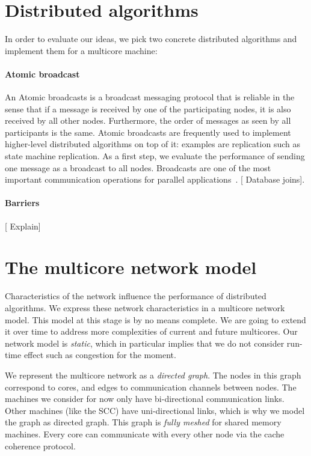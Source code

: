 \documentclass{article}
\newcommand{\stefan}[1]{
  {\color{skRed}[{\color{red}{SK}} #1]}}
\begin{document}
\section{Distributed algorithms}
\label{sec:distalgo}

In order to evaluate our ideas, we pick two concrete distributed
algorithms and implement them for a multicore machine:

\paragraph{Atomic broadcast} An Atomic broadcasts is a broadcast
messaging protocol that is reliable in the sense that if a message is
received by one of the participating nodes, it is also received by all
other nodes. Furthermore, the order of messages as seen by all
participants is the same. Atomic broadcasts are frequently used to
implement higher-level distributed algorithms on top of it: examples
are replication such as state machine replication. As a first step, we
evaluate the performance of sending one message as a broadcast to all
nodes. Broadcasts are one of the most important communication
operations for parallel applications~\cite{Bruck1992}. \stefan{Database
  joins}.

\paragraph{Barriers} \stefan{Explain}

\section{The multicore network model}
\label{sec:model}

Characteristics of the network influence the performance of
distributed algorithms. 
We express these network characteristics in a multicore network
model. This model at this stage is by no means complete. We are going to
extend it over time to address more complexities of current and future
multicores.
Our network model is \emph{static}, which in particular implies that
we do not consider run-time effect such as congestion for the moment.

We represent the multicore network as a \emph{directed graph}. The nodes in
this graph correspond to cores, and edges to communication channels
between nodes. The machines we consider for now only have
bi-directional communication links. Other machines (like the SCC) have
uni-directional links, which is why we model the graph as directed
graph.
This graph is \emph{fully meshed} for shared memory machines. Every core can
communicate with every other node via the cache coherence protocol.
\end{document}
